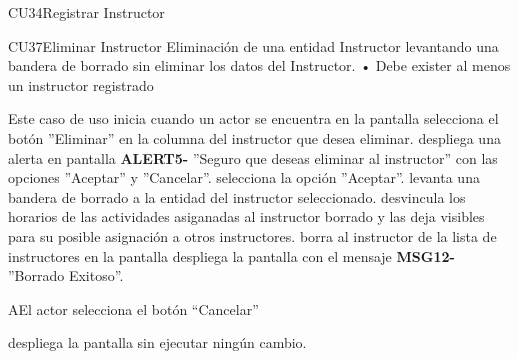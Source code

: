 \begin{UseCase}{CU34}{Registrar Instructor}
{\begin{UseCase}{CU37}{Eliminar Instructor}{
		Eliminación de una entidad Instructor levantando una bandera de borrado sin eliminar los datos del Instructor.
	}
{	• Debe exister al menos un instructor registrado}
\end{UseCase}
\begin{UCtrayectoria}{Este caso de uso inicia cuando un actor se encuentra en la pantalla }
	\UCpaso[\UCactor] selecciona el botón ''Eliminar'' en la columna del instructor que desea eliminar.
	\UCpaso despliega una alerta en pantalla {\bf ALERT5-} ''Seguro que deseas eliminar al instructor'' con las opciones ''Aceptar'' y ''Cancelar''.
	\UCpaso[\UCactor]selecciona la opción ''Aceptar''.
	\UCpaso levanta una bandera de borrado a la entidad del instructor seleccionado.
	\UCpaso desvincula los horarios de las actividades asiganadas al instructor borrado y las deja visibles para su posible asignación a otros instructores.
	\UCpaso borra al instructor de la lista de instructores en la pantalla 
	\UCpaso despliega la pantalla  con el mensaje {\bf MSG12-} ''Borrado Exitoso''.
\end{UCtrayectoria}
\begin{UCtrayectoriaA}{A}{El actor selecciona el botón “Cancelar”}

	\UCpaso despliega la pantalla  sin ejecutar ningún cambio.

\end{UCtrayectoriaA}




}
\end{UseCase}
